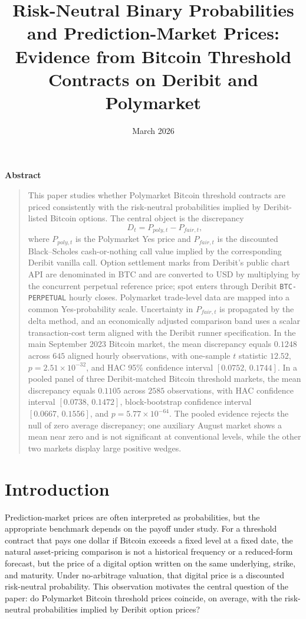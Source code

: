 \documentclass[11pt]{article}
\title{Risk-Neutral Binary Probabilities and Prediction-Market Prices:\\ Evidence from Bitcoin Threshold Contracts on Deribit and Polymarket}
\author{}
\date{March 2026}
\makeatletter
\numberwithin{equation}{section}
\theoremstyle{plain}
\renewcommand{\maketitle}{%
  \begin{center}
    {\LARGE \bfseries \@title \par}
    \vspace{1em}
    {\normalsize \@date \par}
  \end{center}
  \vspace{1em}
}
\renewenvironment{abstract}
  {\begin{center}\bfseries Abstract\end{center}\begin{quote}\small}
  {\end{quote}\vspace{1em}}
\makeatother
\begin{document}
\maketitle

\begin{abstract}
This paper studies whether Polymarket Bitcoin threshold contracts are priced consistently with the risk-neutral probabilities implied by Deribit-listed Bitcoin options. The central object is the discrepancy
\[
D_t = P_{poly,t} - P_{fair,t},
\]
where $P_{poly,t}$ is the Polymarket Yes price and $P_{fair,t}$ is the discounted Black--Scholes cash-or-nothing call value implied by the corresponding Deribit vanilla call. Option settlement marks from Deribit's public chart API are denominated in BTC and are converted to USD by multiplying by the concurrent perpetual reference price; spot enters through Deribit \texttt{BTC-PERPETUAL} hourly closes. Polymarket trade-level data are mapped into a common Yes-probability scale. Uncertainty in $P_{fair,t}$ is propagated by the delta method, and an economically adjusted comparison band uses a scalar transaction-cost term aligned with the Deribit runner specification. In the main September 2023 Bitcoin market, the mean discrepancy equals $0.1248$ across $645$ aligned hourly observations, with one-sample $t$ statistic $12.52$, $p=2.51\times 10^{-32}$, and HAC 95\% confidence interval $[0.0752,\,0.1744]$. In a pooled panel of three Deribit-matched Bitcoin threshold markets, the mean discrepancy equals $0.1105$ across $2585$ observations, with HAC confidence interval $[0.0738,\,0.1472]$, block-bootstrap confidence interval $[0.0667,\,0.1556]$, and $p=5.77\times 10^{-64}$. The pooled evidence rejects the null of zero average discrepancy; one auxiliary August market shows a mean near zero and is not significant at conventional levels, while the other two markets display large positive wedges.
\end{abstract}

\section{Introduction}
Prediction-market prices are often interpreted as probabilities, but the appropriate benchmark depends on the payoff under study. For a threshold contract that pays one dollar if Bitcoin exceeds a fixed level at a fixed date, the natural asset-pricing comparison is not a historical frequency or a reduced-form forecast, but the price of a digital option written on the same underlying, strike, and maturity. Under no-arbitrage valuation, that digital price is a discounted risk-neutral probability. This observation motivates the central question of the paper: do Polymarket Bitcoin threshold prices coincide, on average, with the risk-neutral probabilities implied by Deribit option prices?
\end{document}
